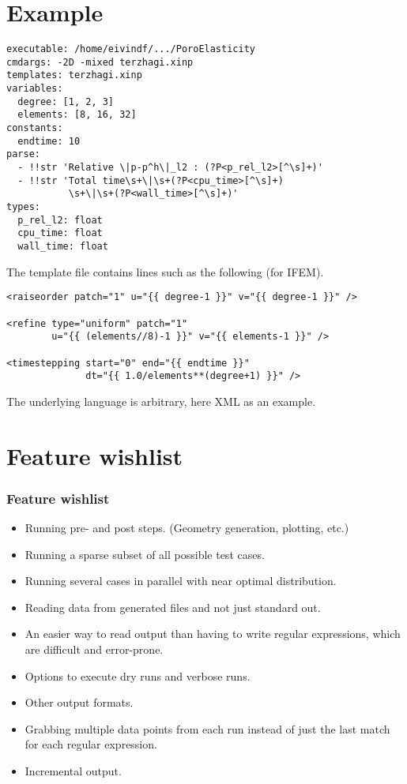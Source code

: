 \documentclass{beamer}
\begin{document}
\section{Example}

\begin{frame}[fragile]
\begin{verbatim}
executable: /home/eivindf/.../PoroElasticity
cmdargs: -2D -mixed terzhagi.xinp
templates: terzhagi.xinp
variables:
  degree: [1, 2, 3]
  elements: [8, 16, 32]
constants:
  endtime: 10
parse:
  - !!str 'Relative \|p-p^h\|_l2 : (?P<p_rel_l2>[^\s]+)'
  - !!str 'Total time\s+\|\s+(?P<cpu_time>[^\s]+)
           \s+\|\s+(?P<wall_time>[^\s]+)'
types:
  p_rel_l2: float
  cpu_time: float
  wall_time: float
\end{verbatim}
\end{frame}

\begin{frame}[fragile]
  The template file contains lines such as the following (for IFEM).

\begin{verbatim}
<raiseorder patch="1" u="{{ degree-1 }}" v="{{ degree-1 }}" />

<refine type="uniform" patch="1"
        u="{{ (elements//8)-1 }}" v="{{ elements-1 }}" />

<timestepping start="0" end="{{ endtime }}"
              dt="{{ 1.0/elements**(degree+1) }}" />
\end{verbatim}

  The underlying language is arbitrary, here XML as an example.
\end{frame}

\section{Feature wishlist}

\begin{frame}
  \frametitle{Feature wishlist}
  
  \begin{itemize}
  \item Running pre- and post steps. (Geometry generation, plotting, etc.)
  \item Running a sparse subset of all possible test cases.
  \item Running several cases in parallel with near optimal distribution.
  \item Reading data from generated files and not just standard out.
  \item An easier way to read output than having to write regular expressions,
    which are difficult and error-prone.
  \item Options to execute dry runs and verbose runs.
  \item Other output formats.
  \item Grabbing multiple data points from each run instead of just the last
    match for each regular expression.
  \item Incremental output.
  \end{itemize}
\end{frame}
\end{document}
